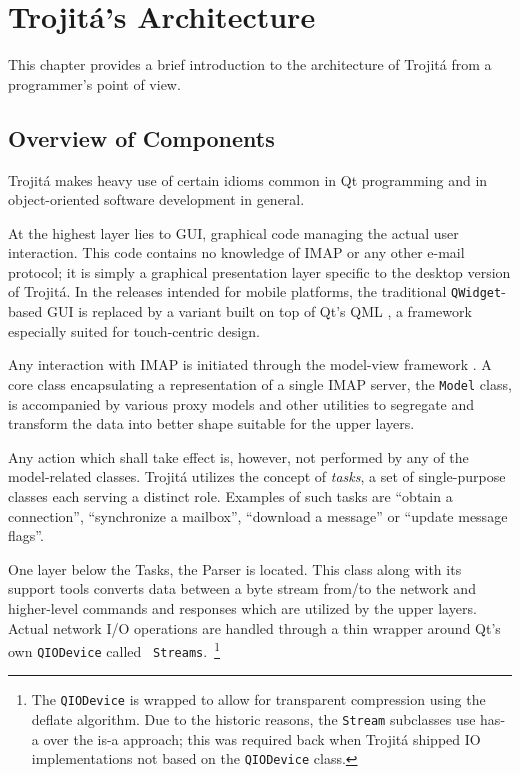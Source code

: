 \documentclass[trojita]{subfiles}
\begin{document}
\chapter{Trojitá's Architecture}

This chapter provides a brief introduction to the architecture of Trojitá from a programmer's point of view.

\section{Overview of Components}

Trojitá makes heavy use of certain idioms common in Qt programming and in object-oriented software development in
general.

At the highest layer lies to GUI, graphical code managing the actual user interaction.  This code contains no knowledge
of IMAP or any other e-mail protocol; it is simply a graphical presentation layer specific to the desktop version of
Trojitá.  In the releases intended for mobile platforms, the traditional {\tt QWidget}-based GUI is replaced by a
variant built on top of Qt's QML \cite{qml}, a framework especially suited for touch-centric design.

Any interaction with IMAP is initiated through the model-view framework \cite{qt-mvc}.  A core class encapsulating a
representation of a single IMAP server, the {\tt Model} class, is accompanied by various proxy models and other
utilities to segregate and transform the data into better shape suitable for the upper layers.

Any action which shall take effect is, however, not performed by any of the model-related classes.  Trojitá utilizes the
concept of {\em tasks}, a set of single-purpose classes each serving a distinct role.  Examples of such tasks are
``obtain a connection'', ``synchronize a mailbox'', ``download a message'' or ``update message flags''.

One layer below the Tasks, the Parser is located.  This class along with its support tools converts data between a
byte stream from/to the network and higher-level commands and responses which are utilized by the upper
layers.  Actual network I/O operations are handled through a thin wrapper around Qt's own {\tt QIODevice} called {\tt
Streams}.~\footnote{The {\tt QIODevice} is wrapped to allow for transparent compression using the deflate algorithm.  Due
to the historic reasons, the {\tt Stream} subclasses use has-a over the is-a approach; this was required back when
Trojitá shipped IO implementations not based on the {\tt QIODevice} class.}
\end{document}
